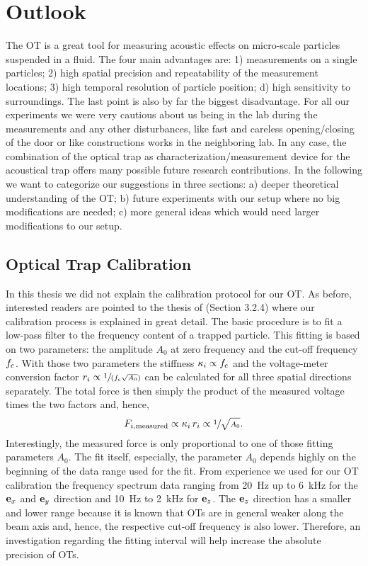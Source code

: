 \section{Outlook}

The OT is a great tool for measuring acoustic effects on micro-scale particles 
suspended in a fluid. The four main advantages are: 1) measurements on a single 
particles; 2) high spatial precision and repeatability of the measurement 
locations; 3) high temporal resolution of particle position; d) high 
sensitivity to surroundings. The last point is also by far the biggest 
disadvantage. For all our experiments we were very cautious about us being in 
the lab during the measurements and any other disturbances, like fast and 
careless opening/closing of the door or like constructions works in the 
neighboring lab. In any case, the combination of the optical trap as 
characterization/measurement device for the acoustical trap offers many 
possible future research contributions. In the following we want to categorize 
our suggestions in three sections: a) deeper theoretical understanding of the 
OT; b) future experiments with our setup where no big modifications are needed; 
c) more general ideas which would need larger modifications to our setup.

\subsection{Optical Trap Calibration}

In this thesis we did not explain the calibration protocol for our OT. As 
before, interested readers are pointed to the thesis of  
(Section 3.2.4) where our calibration process is explained in great detail. The 
basic procedure is to fit a low-pass filter to the frequency content of a 
trapped particle. This fitting is based on two parameters: the amplitude 
$A_{0}$ at zero frequency and the cut-off frequency $f_{\mathrm{c}}$. With those 
two parameters the stiffness $\kappa_{i}\propto f_{\mathrm{c}}$ and the 
voltage-meter conversion factor $r_{i}\propto \sfrac{1}{(f_{\mathrm{c}}\sqrt{A_{0}} 
)}$ can be calculated for all three spatial directions separately. The total 
force is then simply the product of the measured voltage times the two factors 
and, hence, \begin{equation}
  F_{i,\mathrm{measured}}\propto \kappa_{i}\,r_{i}\propto 
  \sfrac{1}{\sqrt{A_{0}}}.
\end{equation}
Interestingly, the measured force is only proportional to one of those fitting 
parameters $A_{0}$. The fit itself, especially, the parameter $A_{0}$ depends 
highly on the beginning of the data range used for the fit. From experience we 
used for our OT calibration the frequency spectrum data ranging from 
\SI{20}{\hertz} up to \SI{6}{\kilo\hertz} for the $\vb{e}_{x}$ and $\vb{e}_{y}$ direction and 
\SI{10}{\hertz} to \SI{2}{\kilo\hertz} for $\vb{e}_{z}$. The $\vb{e}_{z}$ direction has a 
smaller and lower range because it is known that OTs are in general weaker 
along the beam axis and, hence, the respective cut-off frequency is also lower.  
Therefore, an investigation regarding the fitting interval will help increase 
the absolute precision of OTs.

